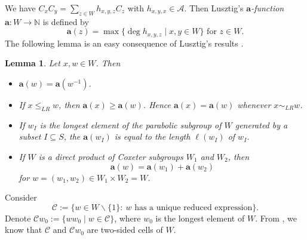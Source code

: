 \documentclass[reqno,12pt]{amsart}
\numberwithin{equation}{section}
\theoremstyle{plain}
\newtheorem{Lem}[Thm]{Lemma}
\theoremstyle{definition}
\renewcommand{\subset}{\subseteq}
\newcommand{\rar}{\rightarrow}
\newcommand{\aff}{ \mathbf{a} }
\newcommand{\lest}{\leqslant}
\renewcommand{\geq}{\geqslant}
\begin{document}






We have $ C_xC_y=\sum_{z\in W} h_{x,y,z}C_z $ with $ h_{x,y,x}\in\mathcal{A} $. Then Lusztig's \textit{$\aff$-function} $ \mathbf{a}:W\rar\mathbb{N} $ is defined by\[
\aff(z)=\max\{\deg h_{x,y,z}\mid x,y\in W \} \text{ for } z\in W.
\]
The following lemma is an easy consequence of Lusztig's results \cite[\S 15]{Lus03}.

\begin{Lem}\label{alem1}
Let $x, w\in W$. Then
	\begin{itemize}\item [(1)]$ \aff(w)=\aff(w^{-1}) $.
		\item [(2)] If $x\lest_{LR} w$, then $\aff(x)\geq\aff(w)$. Hence $\aff(x)=\aff(w)$ whenever $x\sim_{LR} w$.
		\item [(3)] If $ w_I $ is the longest element of the parabolic subgroup of $ W $ generated by a subset $ I\subset S $, the $ \aff(w_I)$ is equal to  the length $\ell(w_I) $ of $ w_I $.
		\item [(4)] If $ W $ is a direct product of  Coxeter subgroups $ W_1 $ and $ W_2 $, then\[
		\aff(w)=\aff(w_1)+\aff(w_2)
		\]for  $ w=(w_1,w_2) \in W_1\times W_2=W$.
	\end{itemize}
\end{Lem}


Consider
$$\mathcal{C}:=\{w\in W\backslash \{1\}: \ w \text{ has a unique reduced expression}\}.$$
Denote $\mathcal{C}w_0:=\{ww_0\mid w\in\mathcal{C}\}$, where $w_0$ is the longest element of $W$. From \cite[Prop. 3.8]{Lus83}, we know that $\mathcal{C}$ and $\mathcal{C}w_0$ are two-sided cells of $W$.
\end{document}
